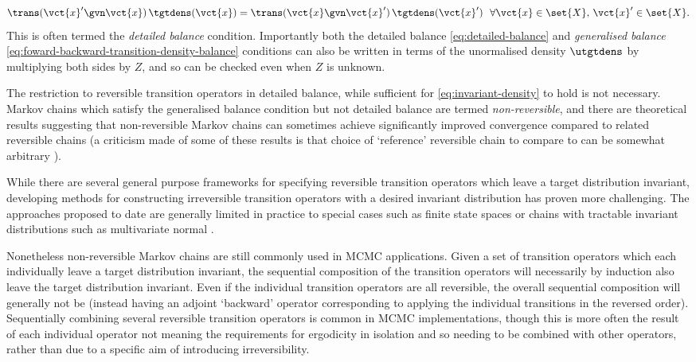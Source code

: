 \begin{equation}\label{eq:detailed-balance}
  \trans(\vct{x}'\gvn\vct{x}) \,\tgtdens(\vct{x}) = 
  \trans(\vct{x}\gvn\vct{x}') \,\tgtdens(\vct{x}')
  ~~\forall \vct{x} \in \set{X},\, \vct{x}' \in \set{X}.
\end{equation}
This is often termed the \emph{detailed balance} condition. Importantly both the detailed balance \eqref{eq:detailed-balance} and \emph{generalised balance} \eqref{eq:foward-backward-transition-density-balance} conditions can also be written in terms of the unormalised density $\utgtdens$ by multiplying both sides by $Z$, and so can be checked even when $Z$ is unknown.

The restriction to reversible transition operators in detailed balance, while sufficient for \eqref{eq:invariant-density} to hold is not necessary. Markov chains which satisfy the generalised balance condition but not detailed balance are termed \emph{non-reversible}, and there are theoretical results suggesting that non-reversible Markov chains can sometimes achieve significantly improved convergence compared to related reversible chains \citep{diaconis2000analysis,neal2004improving,ichiki2013violation} (a criticism made of some of these results is that choice of `reference' reversible chain to compare to can be somewhat arbitrary \citep{mira2000non}).

While there are several general purpose frameworks for specifying reversible transition operators which leave a target distribution invariant, developing methods for constructing irreversible transition operators with a desired invariant distribution has proven more challenging. The approaches proposed to date are generally limited in practice to special cases such as finite state spaces \citep{suwa2010markov,turitsyn2011irreversible,sun2010improving} or chains with tractable invariant distributions such as multivariate normal \citep{bierkens2016non}. 

Nonetheless non-reversible Markov chains are still commonly used in \ac{MCMC} applications. Given a set of transition operators which each individually leave a target distribution invariant, the sequential composition of the transition operators will necessarily by induction also leave the target distribution invariant. Even if the individual transition operators are all reversible, the overall sequential composition will generally not be (instead having an adjoint `backward' operator corresponding to applying the individual transitions in the reversed order). Sequentially combining several reversible transition operators is common in \ac{MCMC} implementations, though this is more often the result of each individual operator not meaning the requirements for ergodicity in isolation and so needing to be combined with other operators, rather than due to a specific aim of introducing irreversibility.

